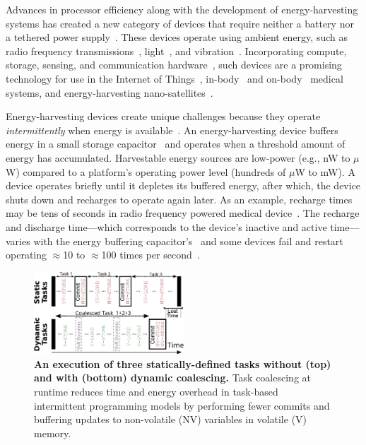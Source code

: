 Advances in processor efficiency along with the development of
energy-harvesting systems has created a new category of devices that require
neither a battery nor a tethered power
supply~\citep{prasad_comst_2014,lucia_snapl_2017,soyata_csm_2016}. These
devices operate using ambient energy, such as radio frequency
transmissions~\citep{rf_powered_computing_gollakota_2014},
light~\citep{margolies_infocom_2016,margolies_tosn_2016}, and
vibration~\citep{gorlatova_sigmetrics_2014}. Incorporating compute, storage,
sensing, and communication hardware~\citep{wisp5,moo,capybara}, such devices are a
promising technology for use in the Internet of Things~\citep{ku_cst_2016},
in-body~\citep{nadeau_naturebio_2017} and
on-body~\citep{bandodkar_electroanalysis_2015} medical systems, and
energy-harvesting nano-satellites~\citep{kicksat,capybara}.

Energy-harvesting devices create unique challenges because they operate {\em
intermittently} when energy is
available~\citep{hicks_isca_2017,lucia_snapl_2017}. An energy-harvesting device
buffers energy in a small storage capacitor~\citep{gorlatova_tmc_2013,gunduz_commag_2014} and operates when a
threshold amount of energy has accumulated. Harvestable energy sources are low-power (e.g., nW to $\mu$W) compared to a platform's operating
power level (hundreds of $\mu$W to mW). A device operates briefly until it depletes its buffered energy, after which, the device shuts
down and recharges to operate again later. As an example, recharge times may be
tens of seconds in radio frequency powered medical device~\cite[Fig.
3c]{nadeau_naturebio_2017}.  The recharge and discharge time---which corresponds to the device's inactive and active time---varies with the energy buffering capacitor's~\cite{capybara} and some devices fail and restart operating $\approx$10 to
$\approx$100 times per second~\citep{tan_infocom_2016,mementos,nvp}.

\begin{figure}
    \centering
    \includegraphics[width=0.5\textwidth]{figures/coalescing-is}
    \caption{\textbf{An execution of three
statically-defined tasks without (top) and with (bottom) dynamic
coalescing.} Task coalescing at runtime reduces time and energy overhead in
task-based intermittent programming models by performing fewer commits and
buffering updates to non-volatile (NV) variables in volatile (V) memory.}
    \label{fig:coalesce}
\end{figure}

